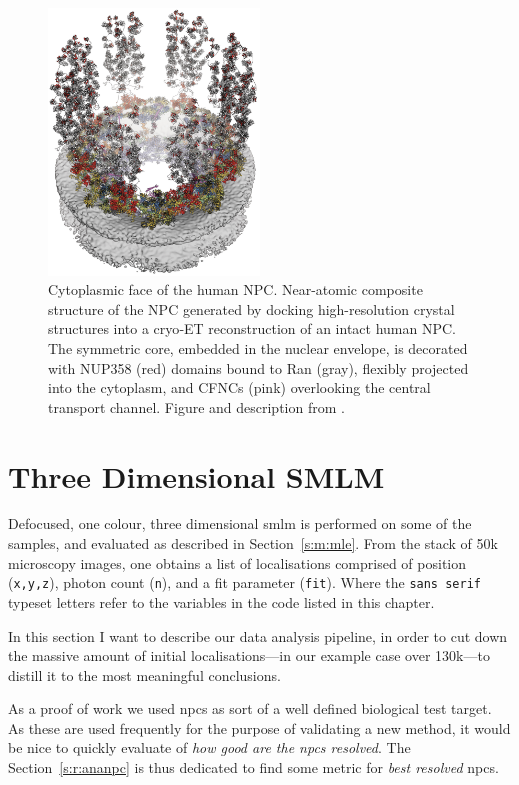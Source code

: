 \documentclass[11pt, a4paper, oneside, twocolumn]{report}
\renewcommand{\tt}{\texttt}
\newcommand{\e}{\emph}
\begin{document}
~ %
\begin{figure}[t!]
  \centering
  \includegraphics[width=0.5\textwidth]{npc/npc3.jpg}
  \caption{Cytoplasmic face of the human NPC.  Near-atomic composite
    structure of the NPC generated by docking high-resolution crystal
    structures into a cryo‑ET reconstruction of an intact human NPC. The
    symmetric core, embedded in the nuclear envelope, is decorated with
    NUP358 (red) domains bound to Ran (gray), flexibly projected into the
    cytoplasm, and CFNCs (pink) overlooking the central transport
    channel. Figure and description from \cite{npc}.}
  \label{f:npc}
\end{figure}

\clearpage\section{Three Dimensional SMLM}\label{s:r:ana}

Defocused, one colour, three dimensional \gls{smlm} is performed on some
of the samples, and evaluated as described in
Section~\ref{s:m:mle}. From the stack of 50k microscopy images, one
obtains a list of localisations comprised of position (\tt{x,y,z}),
photon count (\tt{n}), and a fit parameter (\tt{fit}). Where the
\tt{sans serif} typeset letters refer to the variables in the code
listed in this chapter.

In this section I want to describe our data analysis pipeline, in
order to cut down the massive amount of initial localisations---in our
example case over 130k---to distill it to the most meaningful
conclusions.

As a proof of work we used \gls{npc}s as sort of a well defined
biological test target. As these are used frequently for the purpose
of validating a new method, it would be nice to quickly evaluate of
\e{how good are the \gls{npc}s resolved}. The Section~\ref{s:r:ananpc}
is thus dedicated to find some metric for \e{best resolved}
\gls{npc}s.
\end{document}
